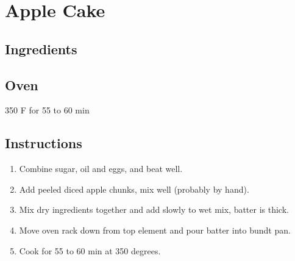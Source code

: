 \documentclass[ansiapaper,10pt,english]{sphinxmanual}
\begin{document}
\chapter{Apple Cake}
\label{\detokenize{Apple_Cake:apple-cake}}\label{\detokenize{Apple_Cake::doc}}

\section{Ingredients}
\label{\detokenize{Apple_Cake:ingredients}}
%
\begin{sphinxVerbatim}[commandchars=\\\{\}]
   

  

 

     

  

   

  

  

  
\end{sphinxVerbatim}


\section{Oven}
\label{\detokenize{Apple_Cake:oven}}
350 F for 55 to 60 min


\section{Instructions}
\label{\detokenize{Apple_Cake:instructions}}\begin{enumerate}
\item {} 
Combine sugar, oil and eggs, and beat well.

\item {} 
Add peeled diced apple chunks, mix well (probably by hand).

\item {} 
Mix dry ingredients together and add slowly to wet mix, batter is thick.

\item {} 
Move oven rack down from top element and pour batter into bundt pan.

\item {} 
Cook for 55 to 60 min at 350 degrees.

\end{enumerate}
\end{document}
